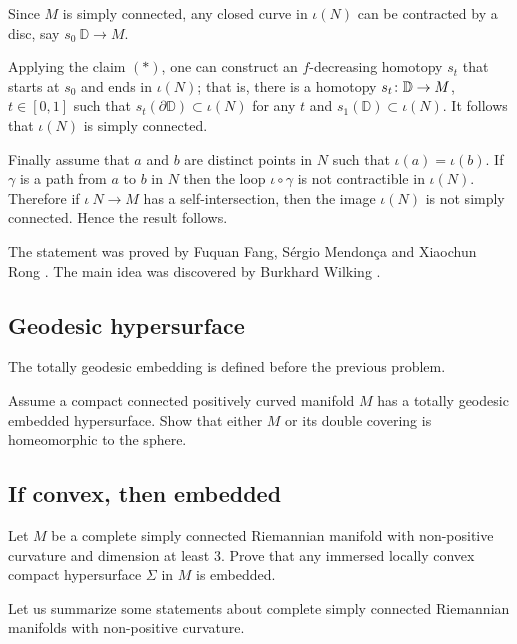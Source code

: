 Since $M$ is simply connected,
any closed curve in $\iota(N)$
can be contracted by a disc, say $s_0\:\mathbb D\to M$.

Applying the claim $({*})$, one can construct an $f$-decreasing homotopy $s_t$ that starts at $s_0$ and ends in $\iota(N)$;
that is, there is 
a homotopy $s_t\:\mathbb D\z\to M$, $t\in [0,1]$ 
such that $s_t(\partial \mathbb D)\subset \iota(N)$ for any $t$ 
and $s_1(\mathbb D)\subset \iota(N)$.
It follows that $\iota(N)$ is simply connected.

Finally assume that $a$ and $b$ are distinct points in $N$ such that $\iota(a)=\iota(b)$.
If $\gamma$ is a path from $a$ to $b$ in $N$ then the loop $\iota\circ\gamma$ is not contractible in $\iota(N)$.
Therefore if $\iota\:N\to M$ has a self-intersection,
then the image
$\iota(N)$ is not simply connected.
Hence the result follows.\qeds


The statement was proved by 
Fuquan Fang, 
S\'ergio Mendon\c{c}a 
and Xiaochun Rong \cite{FMR}.
The main idea was discovered by 
Burkhard Wilking \cite{wilking-2003}.

\subsection*{Geodesic hypersurface}
\label{Geodesic hypersurface}

The totally geodesic embedding is defined before the previous problem.

\begin{pr}
Assume a compact connected positively curved manifold $M$ has a totally geodesic embedded hypersurface.
Show that either $M$ or its double covering is homeomorphic to the sphere.
\end{pr}

\subsection*{If convex, then embedded}
\label{If convex then embedded} 

\begin{pr}
Let $M$ be a complete simply connected Riemannian manifold 
with non-positive curvature 
and dimension at least $3$.
Prove that any immersed locally convex
compact hypersurface $\Sigma$ in $M$ is embedded.
\end{pr}

Let us summarize some statements about complete simply connected Riemannian manifolds 
with non-positive curvature.

